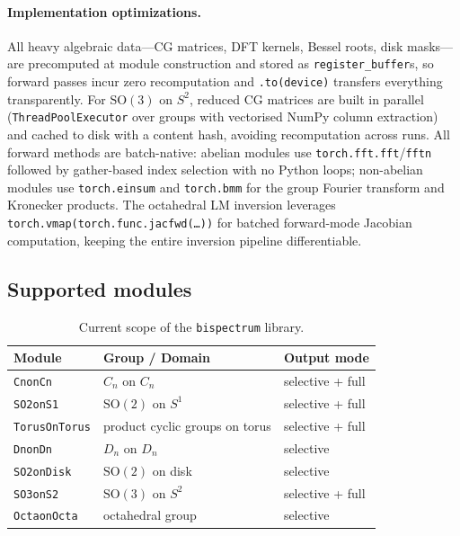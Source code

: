 \documentclass{article}
\newcommand{\SO}{\mathrm{SO}}
\begin{document}
\paragraph{Implementation optimizations.}
All heavy algebraic data---CG matrices, DFT kernels, Bessel roots, disk
masks---are precomputed at module construction and stored as
\texttt{register\_buffer}s, so forward passes incur zero recomputation
and \texttt{.to(device)} transfers everything transparently. For
$\SO(3)$ on $S^2$, reduced CG matrices are built in parallel
(\texttt{ThreadPoolExecutor} over groups with vectorised NumPy column
extraction) and cached to disk with a content hash, avoiding
recomputation across runs. All forward methods are batch-native:
abelian modules use \texttt{torch.fft.fft}/\texttt{fftn} followed by
gather-based index selection with no Python loops; non-abelian modules
use \texttt{torch.einsum} and \texttt{torch.bmm} for the group Fourier
transform and Kronecker products. The octahedral LM inversion leverages
\texttt{torch.vmap(torch.func.jacfwd(\ldots))} for batched forward-mode
Jacobian computation, keeping the entire inversion pipeline
differentiable.

\subsection{Supported modules}
\label{sec:supported-modules}

\begin{table}[h]
  \caption{Current scope of the \texttt{bispectrum} library.}
  \label{tab:supported-groups}
  \centering
  \small
  \begin{tabular}{lll}
    \toprule
    Module & Group / Domain & Output mode \\
    \midrule
    \texttt{CnonCn} & $C_n$ on $C_n$ & selective + full \\
    \texttt{SO2onS1} & $\SO(2)$ on $S^1$ & selective + full \\
    \texttt{TorusOnTorus} & product cyclic groups on torus & selective + full \\
    \texttt{DnonDn} & $D_n$ on $D_n$ & selective \\
    \texttt{SO2onDisk} & $\SO(2)$ on disk & selective \\
    \texttt{SO3onS2} & $\SO(3)$ on $S^2$ & selective + full \\
    \texttt{OctaonOcta} & octahedral group & selective \\
    \bottomrule
  \end{tabular}
\end{table}
\end{document}
